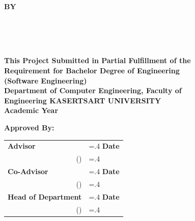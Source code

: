 \thispagestyle{empty}
\begin{center}
    {\huge\textbf{\usevar{\srsTitle}}}\vspace{1in}

    {\huge\textbf{BY}}\vspace{.5in}

    {\huge\textbf{%
        \usevar{\srsAuthorOne} \\
        \usevar{\srsAuthorTwo} \\
        \usevar{\srsAuthorThree} \\
    }}\vfill

    {\large\textbf{%
        This Project Submitted in Partial Fulfillment of the\\
        Requirement for Bachelor Degree of Engineering\\
        (Software Engineering)\\
        Department of Computer Engineering, Faculty of\\
        Engineering KASERTSART UNIVERSITY\\
        Academic Year \usevar{\srsAcademicYear}\\
    }}
\end{center}

\vspace{.5in}

{\large\textbf{Approved By:}}\vspace{.2in}

\begin{tabularx}{1\textwidth}{X >{\hsize=.4\hsize}X}
    \textbf{Advisor}\dotfill & \textbf{Date}\dotfill \\
    \multicolumn{1}{r}{(\usevar{\srsAdvisorName})} & \\[.1in]

    \textbf{Co-Advisor}\dotfill & \textbf{Date}\dotfill \\
    \multicolumn{1}{r}{(\usevar{\srsCoAdvisorName})} & \\[.1in]
    
    \textbf{Head of Department}\dotfill & \textbf{Date}\dotfill \\
    \multicolumn{1}{r}{(\usevar{\srsHoDName})} & \\
\end{tabularx}

\restoregeometry